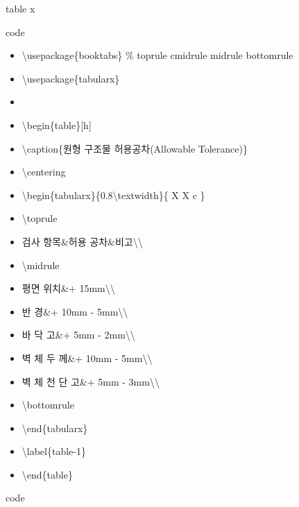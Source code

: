 \documentclass[ aspectratio=149,  14pt,blue,xcolor=pdftex,dvipsnames,table,handout,notes]{beamer}
\begin{document}
		\begin{frame}[t]{table x}

		
			\begin{block}{code}
			\begin{itemize}
				\item[] \textbackslash usepackage\{booktabs\}	\% toprule cmidrule midrule bottomrule  
				\item[] \textbackslash usepackage\{tabularx\}
				\item[] 
				\item[] \textbackslash begin\{table\}[h]
				\item[] \textbackslash caption\{원형 구조물 허용공차(Allowable Tolerance)\}
				\item[] \textbackslash centering 
				\item[] \textbackslash begin\{tabularx\}\{0.8\textbackslash textwidth\}\{ X X c \}
				\item[] \textbackslash toprule
				\item[] 검사  항목\&허용  공차\&비고\textbackslash \textbackslash 
				\item[] \textbackslash midrule
				\item[] 평면  위치\&+ 15mm\textbackslash \textbackslash 
				\item[] 반          경\&+ 10mm  - 5mm\textbackslash \textbackslash 
				\item[] 바    닥    고\&+  5mm  - 2mm\textbackslash \textbackslash 
				\item[] 벽  체  두  께\&+ 10mm  - 5mm\textbackslash \textbackslash 
				\item[] 벽 체 천 단 고\&+  5mm  - 3mm\textbackslash \textbackslash 
				\item[] \textbackslash bottomrule
				\item[] \textbackslash end\{tabularx\} 
				\item[] \textbackslash label\{table-1\}
				\item[] \textbackslash end\{table\}
			\end{itemize}
			\end{block}{code}
	

\end{frame}
\end{document}
